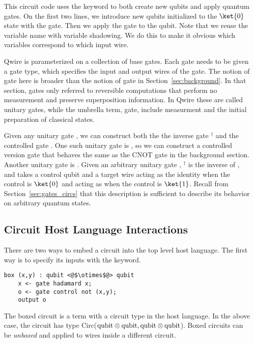 This circuit code uses the  keyword to both create new qubits and apply quantum gates.
On the first two lines, we introduce new qubits initialized to the $\ket{0}$ state with the  gate.
Then we apply the  gate to the  qubit.
Note that we reuse the variable name  with variable shadowing.
We do this to make it obvious which variables correspond to which input wire.

Qwire is parameterized on a collection of base gates. 
Each gate needs to be given a gate type, which specifies the input and output wires of the gate. 
The notion of gate here is broader than the notion of gate in Section~\ref{sec:background}. 
In that section, gates only referred to reversible computations that perform no measurement and preserve superposition information. 
In Qwire these are called unitary gates, while the umbrella term, gate, include measurment and the initial preparation of classical states. 

Given any unitary gate , we can construct both the the inverse gate $^\dagger$ and the controlled gate .
One such unitary gate is , so we can construct a controlled version  gate that behaves the same as the CNOT gate in the background section.
Another unitary gate is .
Given an arbitrary unitary gate , $^\dagger$ is the inverse of , and  takes a control qubit and a target wire acting as the identity when the control is $\ket{0}$ and acting as  when the control is $\ket{1}$.
Recall from Section~\ref{sec:gates_circs} that this description is sufficient to describe its behavior on arbitrary quantum states.

\subsection{Circuit Host Language Interactions}

There are two ways to embed a circuit into the top level host language.
The first way is to specify its inputs with the  keyword.
\begin{lstlisting}[style=customcoq]
box (x,y) : qubit <@$\otimes$@> qubit
    x <- gate hadamard x;
    o <- gate control not (x,y);
    output o
\end{lstlisting}

The boxed circuit is a term with a circuit type in the host language.
In the above case, the circuit has type Circ($\text{qubit}\otimes\text{qubit},\text{qubit}\otimes\text{qubit}$).
Boxed circuits can be \emph{unboxed }and applied to wires inside a different circuit.

